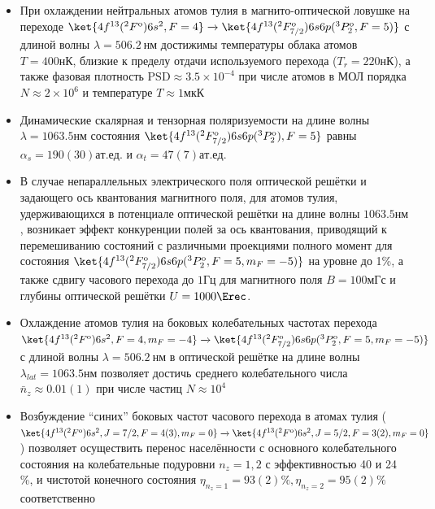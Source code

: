 \begin{itemize}
	\item При охлаждении нейтральных атомов тулия в магнито-оптической ловушке на переходе $\ket{4f^{13}(^2F^\text{o})6s^2, F = 4} \xrightarrow{} \ket{4f^{13}(^2F_{7/2}^\text{o})6s6p(^3P_2^\text{o}, F=5)}$ с длиной волны $\lambda = 506.2~\unit{нм}$ достижимы температуры облака атомов $T = 400\unit{нК}$, близкие к пределу отдачи используемого перехода ($T_r = 220\unit{нК}$), а также фазовая плотность $\text{PSD}\approx3.5\times10^{-4}$ при числе атомов в МОЛ порядка $N \approx 2\times 10^6$ и температуре $T\approx1\unit{мкК}$ %
	\item Динамические скалярная и тензорная поляризуемости на длине волны $\lambda = 1063.5\unit{нм}$ состояния $\ket{4f^{13}(^2F_{7/2}^\text{o})6s6p(^3P_2^\text{o}), F=5}$ равны $\alpha_s = 190(30)\unit{ат.ед.}$ и $\alpha_t = 47(7)\unit{ат.ед.}$
	\item В случае непараллельных электрического поля оптической решётки и задающего ось квантования магнитного поля, для атомов тулия, удерживающихся в потенциале оптической решётки на длине волны $1063.5\unit{нм}$, возникает эффект конкуренции полей за ось квантования, приводящий к перемешиванию состояний с различными проекциями полного момент для состояния $\ket{4f^{13}(^2F_{7/2}^\text{o})6s6p(^3P_2^\text{o}, F=5, m_{F}=-5)}$ на уровне до 1\%, а также сдвигу часового перехода до $1\unit{Гц}$ для магнитного поля $B = 100\unit{мГс}$ и глубины оптической решётки $U = 1000 \Erec$.
	\item Охлаждение атомов тулия на боковых колебательных частотах перехода \\$\ket{4f^{13}(^2F^\text{o})6s^2, F = 4, m_F=-4} \xrightarrow{} \ket{4f^{13}(^2F_{7/2}^\text{o})6s6p(^3P_2^\text{o}, F=5, m_{F}=-5)}$ с длиной волны $\lambda = 506.2~\unit{нм}$ в оптической решётке на длине волны $\lambda_{lat} = 1063.5\unit{нм}$ позволяет достичь среднего колебательного числа $\bar n_z \approx 0.01(1)$ при числе частиц $N\approx 10^4$ %
	\item Возбуждение ``синих'' боковых частот часового перехода в атомах тулия ($\ket{4f^{13}(^2F^\text{o})6s^2, J=7/2, F = 4(3), m_F = 0} \xrightarrow{} \ket{4f^{13}(^2F^\text{o})6s^2, J=5/2, F=3(2), m_{F}=0}$) позволяет осуществить перенос населённости с основного колебательного состояния на колебательные подуровни $n_z = 1, 2$ с эффективностью 40 и 24 \%, и чистотой конечного состояния $\eta_{n_z=1} = 93(2)\%, \eta_{n_z=2} =95(2)\%$ соответственно %
\end{itemize}


